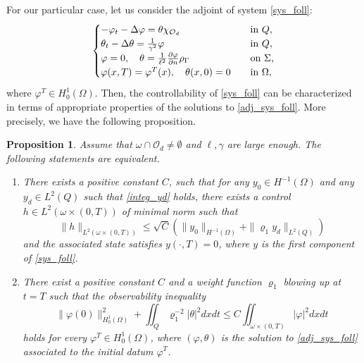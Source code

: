 \documentclass{aims}
\newtheorem{proposition}{Proposition}
\theoremstyle{definition}
\def\csbd{\rho_{\Gamma}}
\begin{document}
For our particular case, let us consider the adjoint of system \eqref{sys_foll}:
%
\begin{equation}\label{adj_sys_foll}
\begin{cases}
-\varphi_t-\Delta \varphi= \theta\chi_{\mathcal O_d} \quad&\textnormal{in }Q, \\
\theta_t-\Delta \theta=\frac{1}{\gamma^2}\varphi \quad& \textnormal{in }Q, \\
\varphi=0, \quad \theta=\frac{1}{\ell^2}\frac{\partial \varphi}{\partial n}\csbd \quad &\textnormal{on $\Sigma$,} \\
\varphi(x,T)=\varphi^T(x), \quad \theta(x,0)=0 \quad &\textnormal{in $\Omega$},
\end{cases}
\end{equation}
%
where $\varphi^T\in H^{1}_0(\Omega)$. Then, the controllability of \eqref{sys_foll} can be characterized in terms of appropriate properties of the solutions to \eqref{adj_sys_foll}. More precisely, we have the following proposition.

\begin{proposition}\label{prop_control}
Assume that $\omega\cap\mathcal O_d\neq \emptyset$ and $\ell,\gamma$ are large enough. The following statements are equivalent.
%
\begin{enumerate}
\item There exists a positive constant $C$, such that for any $y_0\in H^{-1}(\Omega)$ and any $y_d\in L^2(Q)$ such that \eqref{integ_yd} holds, there exists a control $h\in L^2(\omega\times(0,T))$ of minimal norm such that 
%
\begin{equation*}
\|h\|_{L^2(\omega\times(0,T))}\leq \sqrt C\left(\|y_0\|_{H^{-1}(\Omega)}+\|\varrho_1 y_d\|_{L^2(Q)}\right)
\end{equation*}
%
and the associated state satisfies $y(\cdot,T)=0$, where $y$ is the first component of \eqref{sys_foll}.  
%
\item There exist a positive constant $C$ and a weight function $\varrho_1$ blowing up at $t=T$ such that the observability inequality 
%
\begin{equation}\label{obs_ineq_1}
\|\varphi(0)\|_{H^1_{0}(\Omega)}^2+\iint_Q \varrho_1^{-2}|\theta|^2dxdt\leq C\iint_{\omega\times(0,T)}|\varphi|^2dxdt
\end{equation}
%
holds for every $\varphi^T\in H^1_{0}(\Omega)$, where $(\varphi,\theta)$ is the solution to \eqref{adj_sys_foll} associated to the initial datum $\varphi^T$. 
\end{enumerate}
%
\end{proposition}
\end{document}
